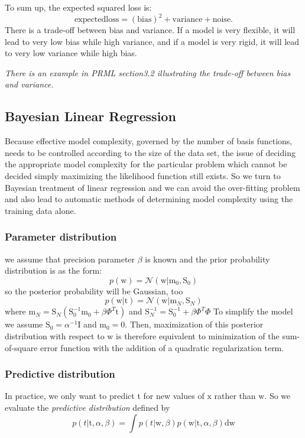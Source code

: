 \documentclass[a4paper]{book}
\newcommand{\mrm}{\mathrm}
\begin{document}
To sum up, the expected squared loss is:
\begin{equation}\label{}
  \mrm{expected loss} = (\mrm{bias})^2+\mrm{variance}+\mrm{noise}.
\end{equation}
There is a trade-off between bias and variance.  If a model is very flexible, it will lead to very low bias while high variance, and if a model is very rigid, it will lead to very low variance while high bias.

\textit{There is an example in PRML section3.2 illustrating the trade-off between bias and variance.}

\subsection{Bayesian Linear Regression}
Because effective model complexity, governed by the number of basis functions, needs to be controlled according to the size of the data set, the issue of deciding the appropriate model complexity for the particular problem which cannot be decided simply maximizing the likelihood function still exists. So we turn to Bayesian treatment of linear regression and we can avoid the over-fitting problem and also lead to automatic methods of determining model complexity using the training data alone.
\subsubsection{Parameter distribution}
we assume that precision parameter $\beta$ is known and the prior  probability distribution is as the form:
\begin{equation}\label{eq2.2.4}
  p(\mathrm w) =\mathcal N(\mathrm w|\mathrm m_0,\mathrm S_0)
\end{equation}
so the posterior probability will be Gaussian, too
\begin{equation}\label{eq2.2.5}
  p(\mathrm w|\mathrm t) = \mathcal N(\mathrm w|\mathrm m_N,\mathrm S_N)
\end{equation}
where $\mathrm m_N=\mathrm S_N(\mathrm S_0^{-1}\mathrm m_0+\beta \Phi^T\mathrm t)$ and $\mathrm S_N^{-1}=\mathrm S_0^{-1}+\beta\Phi^T\Phi$\newline
To simplify the model we assume $\mathrm S_0 = \alpha^{-1}\mathrm I$ and $ \mathrm m_0=\mathrm 0$. Then, maximization of this posterior distribution with respect to $\mathrm w$ is therefore equivalent to minimization of the sum-of-square error function with the addition of a quadratic regularization term.
\subsubsection{Predictive distribution }
In practice, we only want to predict t for new values of $\mathrm x$ rather than $\mathrm w$. So we evaluate the \textit{predictive distribution} defined by
\begin{equation}\label{eq2.2.6}
  p(t|\mathrm t,\alpha,\beta) = \int p(t|\mathrm w,\beta)p(\mathrm w|\mathrm t,\alpha,\beta)\mathrm {dw}
\end{equation}
\end{document}

